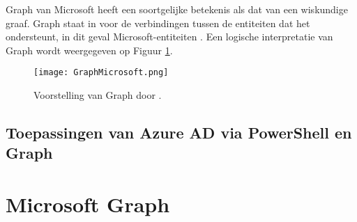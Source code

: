 Graph van Microsoft heeft een soortgelijke betekenis als dat van een wiskundige graaf. Graph staat in voor de verbindingen tussen de entiteiten dat het ondersteunt, in dit geval Microsoft-entiteiten \autocite{Kokkarinen2022}. Een logische interpretatie van Graph wordt weergegeven op Figuur \ref{gms}.

\begin{figure}
    \texttt{[image: GraphMicrosoft.png]}
    \caption[Voorbeeld Microsoft Graph]{Voorstelling van Graph door \textcite{Microsoft2017}.}
    \label{gms}
\end{figure}

\subsection{Toepassingen van Azure AD via PowerShell en Graph} 


\section{Microsoft Graph}

\lipsum[10-12]




